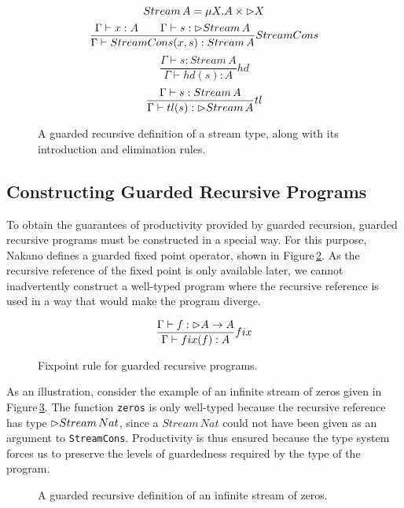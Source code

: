 \begin{figure}
\[
Stream\,A = \mu X. A \times \rhd X
\]
\[
\frac{\Gamma\vdash x : A \quad \quad \Gamma\vdash s : \rhd Stream\,A}{\Gamma\vdash StreamCons(x,s) : Stream\,A} StreamCons
\]
\[
\frac{\Gamma\vdash s : Stream\,A}{\Gamma\vdash hd(s) : A} hd
\]
\[
\frac{\Gamma\vdash s : Stream\,A}{\Gamma\vdash tl(s) : \rhd Stream\,A} tl
\]
\caption{A guarded recursive definition of a stream type, along with its introduction and elimination rules.}
\label{fig:guarded_recursion_stream}
\end{figure} 


\subsection{Constructing Guarded Recursive Programs}
\label{sec:constr-guard-recurs}
To obtain the guarantees of productivity provided by guarded recursion, guarded
recursive programs must be constructed in a special way. For this purpose,
Nakano defines a guarded fixed point operator, shown in
Figure\,\ref{fig:guarded_recursion_fixpoint}. As the recursive reference of the
fixed point is only available later, we cannot inadvertently construct a well-typed program where the recursive reference is used in a way that would make the program diverge.
\begin{figure}
\[
\frac { \Gamma \vdash f : \rhd A \rightarrow A }{ \Gamma \vdash fix(f) : A } fix
\]
\caption{Fixpoint rule for guarded recursive programs.}
\label{fig:guarded_recursion_fixpoint}
\end{figure} 
As an illustration, consider the example of an infinite stream of zeros given in Figure\,\ref{fig:guarded_recursion_zeros}. The function \texttt{zeros} is only well-typed because the recursive reference has type $\rhd Stream\,Nat$, since a $Stream\,Nat$ could not have been given as an argument to \texttt{StreamCons}. Productivity is thus ensured because the type system forces us to preserve the levels of guardedness required by the type of the program.
\begin{figure}

\caption{A guarded recursive definition of an infinite stream of zeros.}
\label{fig:guarded_recursion_zeros}
\end{figure}

